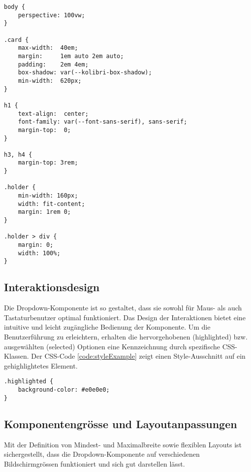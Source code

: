 \begin{lstlisting}[style = htmlcssjs, caption = style.css der Demo-Page, label = code:styleDemoPage]
body {
    perspective: 100vw;
}

.card {
    max-width:  40em;
    margin:     1em auto 2em auto;
    padding:    2em 4em;
    box-shadow: var(--kolibri-box-shadow);
    min-width:  620px;
}

h1 {
    text-align:  center;
    font-family: var(--font-sans-serif), sans-serif;
    margin-top:  0;
}

h3, h4 {
    margin-top: 3rem;
}

.holder {
    min-width: 160px;
    width: fit-content;
    margin: 1rem 0;
}

.holder > div {
    margin: 0;
    width: 100%;
}
\end{lstlisting}


\subsection{Interaktionsdesign}
\label{sec:interactionDesign}

Die Dropdown-Komponente ist so gestaltet, dass sie sowohl für Maus- als auch Tastaturbenutzer optimal funktioniert. 
Das Design der Interaktionen bietet eine intuitive und leicht zugängliche Bedienung der Komponente.
Um die Benutzerführung zu erleichtern, erhalten die hervorgehobenen (highlighted) bzw. ausgewählten (selected) Optionen eine Kennzeichnung durch spezifische CSS-Klassen.
Der CSS-Code \ref{code:styleExample} zeigt einen Style-Ausschnitt auf ein gehighlightetes Element.

\begin{lstlisting}[style = htmlcssjs, caption = Style Beispiel für Zustand Highlight, label = code:styleExample]
.highlighted {
    background-color: #e0e0e0; 
}
\end{lstlisting}


\subsection{Komponentengrösse und Layoutanpassungen}
\label{sec:sizeLayoutChanges}

Mit der Definition von Mindest- und Maximalbreite sowie flexiblen Layouts ist sichergestellt, 
dass die Dropdown-Komponente auf verschiedenen Bildschirmgrössen funktioniert und sich gut darstellen lässt.

